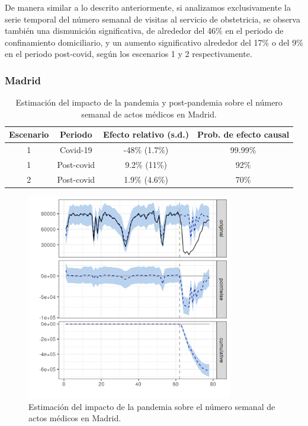 \documentclass[12pt,twoside]{article} %
\begin{document}
De manera similar a lo descrito anteriormente, si analizamos exclusivamente la serie temporal del número semanal de visitas al servicio de obstetricia, se observa también una dismunición significativa, de alrededor del 46\% en el periodo de confinamiento domiciliario, y un aumento significativo alrededor del 17\% o del 9\% en el periodo post-covid, según los escenarios 1 y 2 respectivamente. 
    
\subsubsection{Madrid}\label{madrid}
\begin{table}[H]\caption{Estimación del impacto de la pandemia y post-pandemia sobre el número semanal de actos médicos en Madrid.}
    \centering  
      \begin{tabular}{ |c|c|c|c| }
          \hline
          \textbf{Escenario} & \textbf{Periodo} & \textbf{Efecto relativo (s.d.)} & \textbf{Prob. de efecto causal} \\ 
          \hline
       1 & Covid-19 & -48\% (1.7\%) & 99.99\% \\  
       1 & Post-covid & 9.2\% (11\%) & 92\% \\
       \hline   
       2 & Post-covid & 1.9\% (4.6\%) & 70\% \\
       \hline
      \end{tabular}
  \end{table}
  
  \begin{center}
      \begin{figure}[H]
        \includegraphics[width=9cm]{global_covid_Madrid.png}\caption{Estimación del impacto de la pandemia sobre el número semanal de actos médicos en Madrid.}
      \end{figure}
      \end{center}
      
\end{document}
